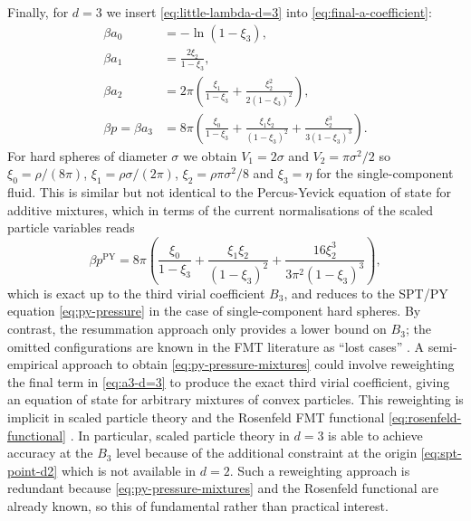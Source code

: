\documentclass[11pt,twoside]{report}
\begin{document}
Finally, for $d=3$ we insert \eqref{eq:little-lambda-d=3} into \eqref{eq:final-a-coefficient}:
\begin{subequations}
  \begin{align}
    \beta a_0 &= -\ln{(1 - \xi_3)},
    \\
    \beta a_1 &= \frac{2 \xi_2}{1-\xi_3},
    \\
    \beta a_2 &=
    2 \pi
    \left(
    \frac{\xi_1}{1-\xi_3}
    + \frac{\xi_2^2}{2(1-\xi_3)^2}
    \right),
    \\
    \beta p =
    \beta a_3 &=
    8 \pi
    \left(
    \frac{\xi_0}{1-\xi_3}
    + \frac{\xi_1 \xi_2}{(1-\xi_3)^2}
    + \frac{\xi_2^3}{3 (1-\xi_3)^3}
    \right).
    \label{eq:a3-d=3}
  \end{align}
\end{subequations}
For hard spheres of diameter $\sigma$ we obtain $V_1 = 2\sigma$ and $V_2 = \pi \sigma^2 / 2$ so $\xi_0 = \rho / (8\pi)$, $\xi_1 = \rho \sigma / (2\pi)$, $\xi_2 = \rho \pi \sigma^2 / 8$ and $\xi_3 = \eta$ for the single-component fluid.
This is similar but not identical to the Percus-Yevick equation of state%
for additive mixtures, which in terms of the current normalisations of the scaled particle variables reads \cite{Santos2016}
\begin{equation}\label{eq:py-pressure-mixtures}
  \beta p^\mathrm{PY} =
  8 \pi
  \left(
  \frac{\xi_0}{1-\xi_3}
  + \frac{\xi_1 \xi_2}{(1-\xi_3)^2}
  + \frac{16 \xi_2^3}{3 \pi^2 (1-\xi_3)^3}
  \right),
\end{equation}
which is exact up to the third virial coefficient $B_3$, and reduces to the SPT/PY equation \eqref{eq:py-pressure} in the case of single-component hard spheres.
By contrast, the resummation approach only provides a lower bound on $B_3$; the omitted configurations are known in the FMT literature as ``lost cases'' \cite{TarazonaPRE1997}.
A semi-empirical approach to obtain \eqref{eq:py-pressure-mixtures} could involve reweighting the final term in \eqref{eq:a3-d=3} to produce the exact third virial coefficient, giving an equation of state for arbitrary mixtures of convex particles.
This reweighting is implicit in scaled particle theory and the Rosenfeld FMT functional \eqref{eq:rosenfeld-functional} \cite{TarazonaPRE1997,MarechalPRE2014}.
In particular, scaled particle theory in $d=3$ is able to achieve accuracy at the $B_3$ level because of the additional constraint at the origin \eqref{eq:spt-point-d2} which is not available in $d=2$.
Such a reweighting approach is redundant because \eqref{eq:py-pressure-mixtures} and the Rosenfeld functional are already known, so this of fundamental rather than practical interest.
\end{document}
